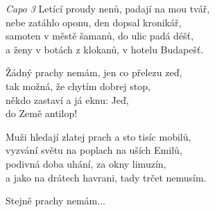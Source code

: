 \re{}
\textit{Capo 3
}
\ve{}
Letící proudy nenů, padají na mou tvář,\\
nebe zatáhlo oponu, den dopsal kronikář,\\
samoten v městě šamanů, do ulic padá déšť,\\
a ženy v botách z klokanů, v hotelu Budapešť.

\cho{}
Žádný prachy nemám, jen co přelezu zeď,\\
tak možná, že chytím dobrej stop,\\
někdo zastaví a já eknu:  Jeď,\\
do Země antilop!

\ve{}
Muži hledají zlatej prach a sto tisíc mobilů,\\
vyzvání světu na poplach na uších Emilů,\\
podivná doba uhání, za okny limuzín,\\
a jako na drátech havrani, tady trčet nemusím.

\cho{} 
Stejně prachy nemám...
\cho{}


\esong{}